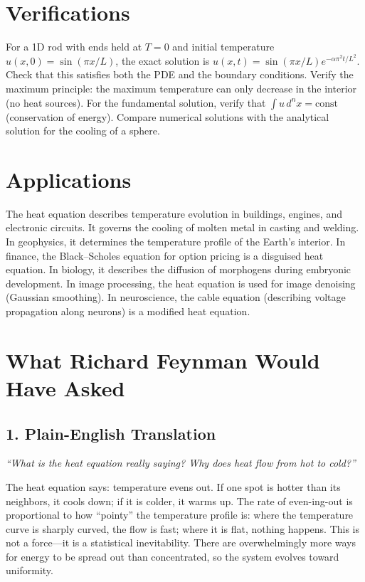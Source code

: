 \section*{Verifications}

For a 1D rod with ends held at $T = 0$ and initial temperature $u(x, 0) = \sin(\pi x/L)$, the exact solution is $u(x, t) = \sin(\pi x/L)e^{-\alpha\pi^2 t/L^2}$. Check that this satisfies both the PDE and the boundary conditions. Verify the maximum principle: the maximum temperature can only decrease in the interior (no heat sources). For the fundamental solution, verify that $\int u\,d^nx = \text{const}$ (conservation of energy). Compare numerical solutions with the analytical solution for the cooling of a sphere.
\section*{Applications}

The heat equation describes temperature evolution in buildings, engines, and electronic circuits. It governs the cooling of molten metal in casting and welding. In geophysics, it determines the temperature profile of the Earth's interior. In finance, the Black--Scholes equation for option pricing is a disguised heat equation. In biology, it describes the diffusion of morphogens during embryonic development. In image processing, the heat equation is used for image denoising (Gaussian smoothing). In neuroscience, the cable equation (describing voltage propagation along neurons) is a modified heat equation.
\section*{What Richard Feynman Would Have Asked}

\subsection*{1. Plain-English Translation}
\textit{``What is the heat equation really saying? Why does heat flow from hot to cold?''}

The heat equation says: temperature evens out. If one spot is hotter than its neighbors, it cools down; if it is colder, it warms up. The rate of even-ing-out is proportional to how ``pointy'' the temperature profile is: where the temperature curve is sharply curved, the flow is fast; where it is flat, nothing happens. This is not a force---it is a statistical inevitability. There are overwhelmingly more ways for energy to be spread out than concentrated, so the system evolves toward uniformity.

